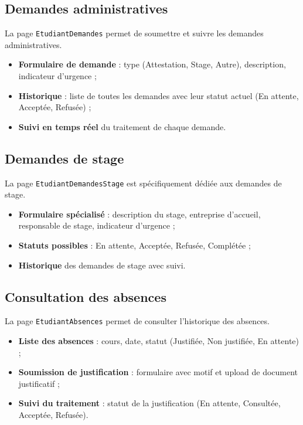 \subsection{Demandes administratives}

La page \texttt{EtudiantDemandes} permet de soumettre et suivre les demandes administratives.

\begin{itemize}[noitemsep]
    \item \textbf{Formulaire de demande} : type (Attestation, Stage, Autre), description, indicateur d'urgence ;
    \item \textbf{Historique} : liste de toutes les demandes avec leur statut actuel (En attente, Acceptée, Refusée) ;
    \item \textbf{Suivi en temps réel} du traitement de chaque demande.
\end{itemize}

\subsection{Demandes de stage}

La page \texttt{EtudiantDemandesStage} est spécifiquement dédiée aux demandes de stage.

\begin{itemize}[noitemsep]
    \item \textbf{Formulaire spécialisé} : description du stage, entreprise d'accueil, responsable de stage, indicateur d'urgence ;
    \item \textbf{Statuts possibles} : En attente, Acceptée, Refusée, Complétée ;
    \item \textbf{Historique} des demandes de stage avec suivi.
\end{itemize}

\subsection{Consultation des absences}

La page \texttt{EtudiantAbsences} permet de consulter l'historique des absences.

\begin{itemize}[noitemsep]
    \item \textbf{Liste des absences} : cours, date, statut (Justifiée, Non justifiée, En attente) ;
    \item \textbf{Soumission de justification} : formulaire avec motif et upload de document justificatif ;
    \item \textbf{Suivi du traitement} : statut de la justification (En attente, Consultée, Acceptée, Refusée).
\end{itemize}

